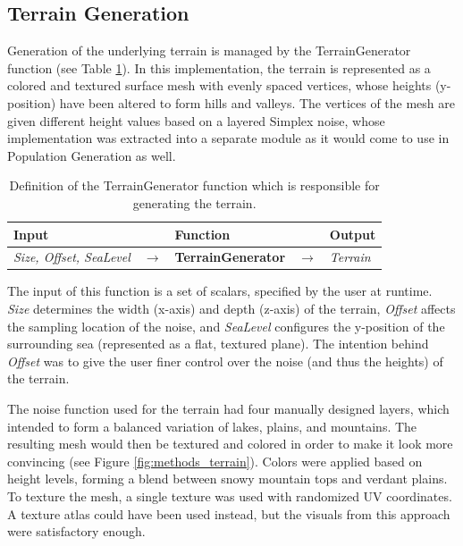 \subsection{Terrain Generation}

Generation of the underlying terrain is managed by the TerrainGenerator function (see Table \ref{table:terrgen}).
In this implementation, the terrain is represented as a colored and textured surface mesh with evenly spaced vertices, whose heights (y-position) have been altered to form hills and valleys.
The vertices of the mesh are given different height values based on a layered Simplex noise, whose implementation was extracted into a separate module as it would come to use in Population Generation as well.

\begin{table}[H]
  \centering
  \begin{tabular}{lllll}
    \textbf{Input} & & \textbf{Function} & & \textbf{Output} \\
    \midrule
    \textit{Size, Offset, SeaLevel} & $\rightarrow$ & \textbf{TerrainGenerator} & $\rightarrow$ & \textit{Terrain} \\
    \bottomrule
  \end{tabular}

  \caption{Definition of the TerrainGenerator function which is responsible for generating the terrain.}
  \label{table:terrgen}
\end{table}
\vspace{-0.4cm} %

The input of this function is a set of scalars, specified by the user at runtime.
\textit{Size} determines the width (x-axis) and depth (z-axis) of the terrain,
\textit{Offset} affects the sampling location of the noise, and \textit{SeaLevel} configures the y-position of the surrounding sea (represented as a flat, textured plane).
The intention behind \textit{Offset} was to give the user finer control over the noise (and thus the heights) of the terrain.

The noise function used for the terrain had four manually designed layers, which intended to form a balanced variation of lakes, plains, and mountains.
The resulting mesh would then be textured and colored in order to make it look more convincing (see Figure \ref{fig:methods_terrain}).
Colors were applied based on height levels, forming a blend between snowy mountain tops and verdant plains.
To texture the mesh, a single texture was used with randomized UV coordinates.
A texture atlas could have been used instead, but the visuals from this approach were satisfactory enough.

